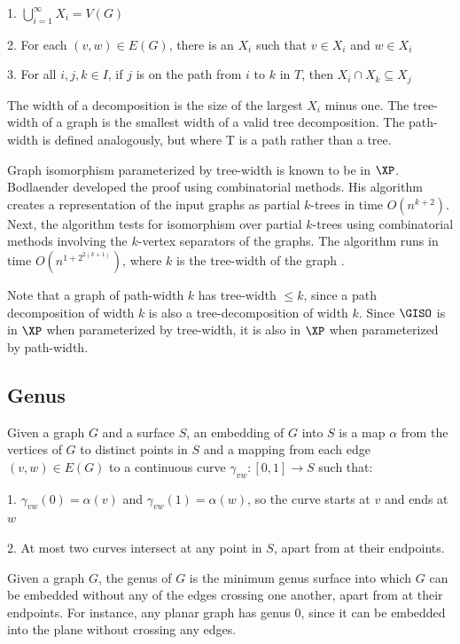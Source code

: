 \documentclass[11pt]{report}
\begin{document}
1. $\displaystyle\bigcup_{i=1}^{\infty}X_i = V(G)$

2. For each $(v,w)\in E(G)$, there is an $X_i$ such that $v\in X_i$ and $w \in X_i$

3. For all $i,j,k\in I$, if $j$ is on the path from $i$ to $k$ in $T$, then $X_i \cap X_k \subseteq X_j$

The width of a decomposition is the size of the largest $X_i$ minus one. The tree-width of a graph is the smallest width of a valid tree decomposition. The path-width is defined analogously, but where T is a path rather than a tree.

Graph isomorphism parameterized by tree-width is known to be in $\XP$. Bodlaender developed the proof using combinatorial methods. His algorithm creates a representation of the input graphs as partial $k$-trees in time $O(n^{k+2})$. Next, the algorithm  tests for isomorphism over partial $k$-trees using combinatorial methods involving the $k$-vertex separators of the graphs. The algorithm runs in time $O(n^{1+2^{2(k+1)}})$, where $k$ is the tree-width of the graph \cite{Bodlaender90}. 

Note that a graph of path-width $k$ has tree-width $\leq k$, since a path decomposition of width $k$ is also a tree-decomposition of width $k$. Since $\GISO$ is in $\XP$ when parameterized by tree-width, it is also in $\XP$ when parameterized by path-width.






\subsection{Genus} 

Given a graph $G$ and a surface $S$, an embedding of $G$ into $S$ is a map $\alpha$ from the vertices of $G$ to distinct points in $S$ and a mapping from each edge $(v,w)\in E(G)$ to a continuous curve $\gamma _{vw}: [0,1] \rightarrow S$ such that:

1. $\gamma _{vw}(0) = \alpha (v)$ and $\gamma _{vw}(1) =\alpha (w)$, so the curve starts at $v$ and ends at $w$

2. At most two curves intersect at any point in $S$, apart from at their endpoints.

Given a graph $G$, the genus of $G$ is the minimum genus surface into which $G$ can be embedded without any of the edges crossing one another, apart from at their endpoints. For instance, any planar graph has genus 0, since it can be embedded into the plane without crossing any edges.
\end{document}
